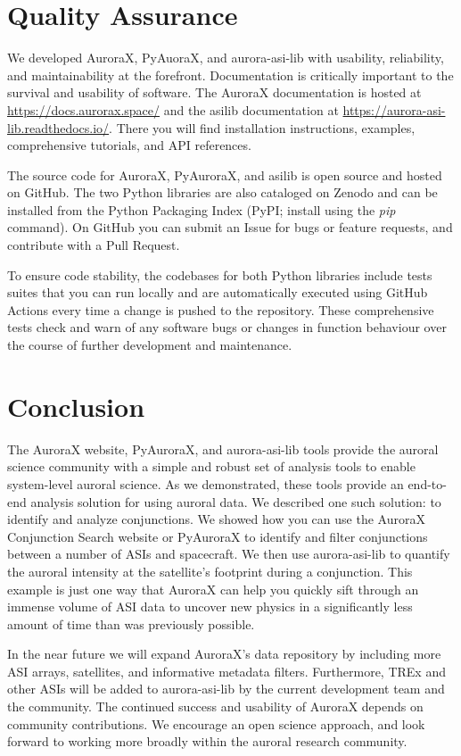 \documentclass[utf8]{FrontiersinHarvard} %
\begin{document}
\section{Quality Assurance}
We developed AuroraX, PyAuoraX, and aurora-asi-lib with usability, reliability, and maintainability at the forefront. Documentation is critically important to the survival and usability of software. The AuroraX documentation is hosted at \url{https://docs.aurorax.space/} and the asilib documentation at \url{https://aurora-asi-lib.readthedocs.io/}. There you will find installation instructions, examples, comprehensive tutorials, and API references.

The source code for AuroraX, PyAuroraX, and asilib  is open source and hosted on GitHub. The two Python libraries are also cataloged on Zenodo and can be installed from the Python Packaging Index (PyPI; install using the \textit{pip} command). On GitHub you can submit an Issue for bugs or feature requests, and contribute with a Pull Request.  

To ensure code stability, the codebases for both Python libraries include tests suites that you can run locally and are automatically executed using GitHub Actions every time a change is pushed to the repository. These comprehensive tests check and warn of any software bugs or changes in function behaviour over the course of further development and maintenance.


\section{Conclusion}
The AuroraX website, PyAuroraX, and aurora-asi-lib tools provide the auroral science community with a simple and robust set of analysis tools to enable system-level auroral science. As we demonstrated, these tools provide an end-to-end analysis solution for using auroral data. We described one such solution: to identify and analyze conjunctions. We showed how you can use the AuroraX Conjunction Search website or PyAuroraX to identify and filter conjunctions between a number of ASIs and spacecraft. We then use aurora-asi-lib to quantify the auroral intensity at the satellite's footprint during a conjunction. This example is just one way that AuroraX can help you quickly sift through an immense volume of ASI data to uncover new physics in a significantly less amount of time than was previously possible.

In the near future we will expand AuroraX’s data repository by including more ASI arrays, satellites, and informative metadata filters. Furthermore, TREx and other ASIs will be added to aurora-asi-lib by the current development team and the community. The continued success and usability of AuroraX depends on community contributions. We encourage an open science approach, and look forward to working more broadly within the auroral research community.
\end{document}
